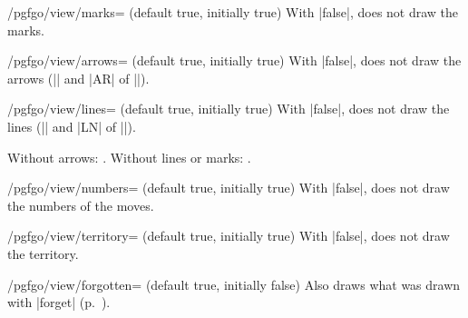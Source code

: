	\begin{key}{/pgfgo/view/marks= (default true, initially true)}
		With |false|, does not draw the marks.
	\end{key}

	\begin{key}{/pgfgo/view/arrows= (default true, initially true)}
		With |false|, does not draw the arrows (|\arrow| and |AR| of |\sgf|).
	\end{key}

	\begin{key}{/pgfgo/view/lines= (default true, initially true)}
		With |false|, does not draw the lines (|\line| and |LN| of |\sgf|).

		\begin{codeexample}[]
			\begin{goban}[5, name = board-arrows]
			\end{goban}

			Without arrows: .
			Without lines or marks: .
		\end{codeexample}
	\end{key}

	\begin{key}{/pgfgo/view/numbers= (default true, initially true)}
		With |false|, does not draw the numbers of the moves.
	\end{key}

	\begin{key}{/pgfgo/view/territory= (default true, initially true)}
		With |false|, does not draw the territory.
	\end{key}

	\begin{key}{/pgfgo/view/forgotten= (default true, initially false)}
		Also draws what was drawn with |forget| (p.~\pageref{subsec:recordar}).

		\begin{codeexample}[]
			\begin{goban}[5, name = board3]
			\end{goban}

		\end{codeexample}
	\end{key}

